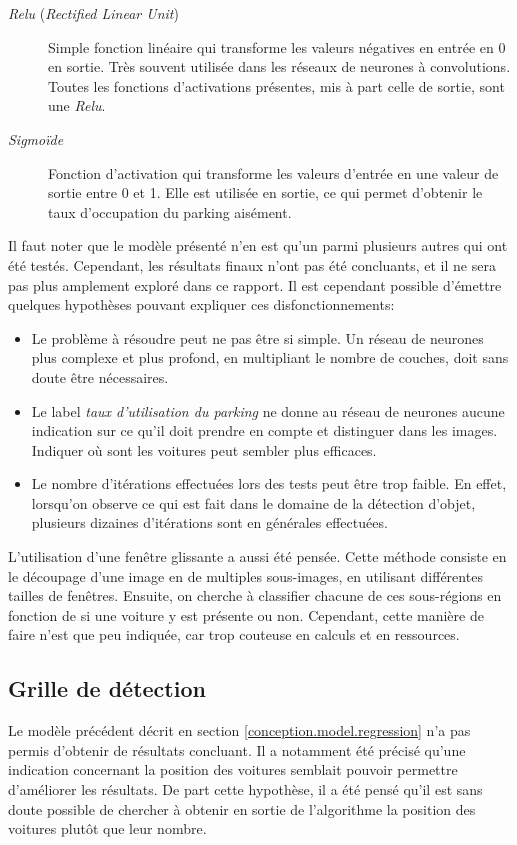 \begin{description}
    \item[\textit{Relu} (\textit{Rectified Linear Unit})] Simple fonction linéaire qui transforme les valeurs négatives en entrée en $0$ en sortie. Très souvent utilisée dans les réseaux de neurones à convolutions. Toutes les fonctions d'activations présentes, mis à part celle de sortie, sont une \textit{Relu}.
    \item[\textit{Sigmoïde}] Fonction d'activation qui transforme les valeurs d'entrée en une valeur de sortie entre 0 et 1. Elle est utilisée en sortie, ce qui permet d'obtenir le taux d'occupation du parking aisément.
\end{description}

Il faut noter que le modèle présenté n'en est qu'un parmi plusieurs autres qui ont été testés. Cependant, les résultats finaux n'ont pas été concluants, et il ne sera pas plus amplement exploré dans ce rapport. Il est cependant possible d'émettre quelques hypothèses pouvant expliquer ces disfonctionnements:

\begin{itemize}
    \item Le problème à résoudre peut ne pas être si simple. Un réseau de neurones plus complexe et plus profond, en multipliant le nombre de couches, doit sans doute être nécessaires. 
    \item Le label \textit{taux d'utilisation du parking} ne donne au réseau de neurones aucune indication sur ce qu'il doit prendre en compte et distinguer dans les images. Indiquer où sont les voitures peut sembler plus efficaces.
    \item Le nombre d'itérations effectuées lors des tests peut être trop faible. En effet, lorsqu'on observe ce qui est fait dans le domaine de la détection d'objet, plusieurs dizaines d'itérations sont en générales effectuées. 
\end{itemize}

L'utilisation d'une fenêtre glissante a aussi été pensée. Cette méthode consiste en le découpage d'une image en de multiples sous-images, en utilisant différentes tailles de fenêtres. Ensuite, on cherche à classifier chacune de ces sous-régions en fonction de si une voiture y est présente ou non. Cependant, cette manière de faire n'est que peu indiquée, car trop couteuse en calculs et en ressources.

\subsection{Grille de détection} 
Le modèle précédent décrit en section \ref{conception.model.regression} n'a pas permis d'obtenir de résultats concluant. Il a notamment été précisé qu'une indication concernant la position des voitures semblait pouvoir permettre d'améliorer les résultats. De part cette hypothèse, il a été pensé qu'il est sans doute possible de chercher à obtenir en sortie de l'algorithme la position des voitures plutôt que leur nombre.

